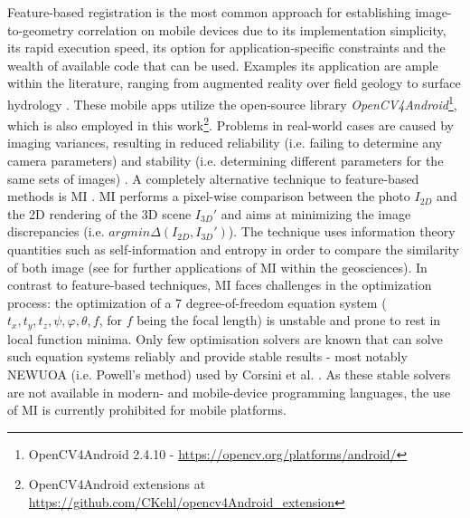\documentclass[review]{elsarticle}
\begin{document}
Feature-based registration is the most common approach for establishing image-to-geometry correlation on mobile devices due to its implementation simplicity, its rapid execution speed, its option for application-specific constraints and the wealth of available code that can be used. Examples its application are ample within the literature, ranging from augmented reality \cite{Gauglitz2014,Sweeney2015} over field geology \cite{Kehl2016_ISPRS,Kehl2017_VGC} to surface hydrology \cite{Kroehnert2017a,Boerner2016}. These mobile apps utilize the open-source library \textit{OpenCV4Android}\footnote{OpenCV4Android 2.4.10 - \url{https://opencv.org/platforms/android/}}, which is also employed in this work\footnote{OpenCV4Android extensions at \url{https://github.com/CKehl/opencv4Android_extension}}. Problems in real-world cases are caused by imaging variances, resulting in reduced reliability (i.e. failing to determine any camera parameters) and stability (i.e. determining different parameters for the same sets of images) \cite{Kehl2017_PHOR}. A completely alternative technique to feature-based methods is \gls{MI} \cite{Viola1997,Corsini2013}. \Gls{MI} performs a pixel-wise comparison between the photo $I_{2D}$ and the 2D rendering of the 3D scene $I_{3D}'$ and aims at minimizing the image discrepancies (i.e. $argmin \Delta(I_{2D}, I_{3D}')$). The technique uses information theory quantities such as self-information and entropy in order to compare the similarity of both image (see \cite{Bonaventura2017} for further applications of \gls{MI} within the geosciences). In contrast to feature-based techniques, \gls{MI} faces challenges in the optimization process: the optimization of a 7 degree-of-freedom equation system ($t_x,t_y,t_z,\psi,\varphi,\theta,f$, for $f$ being the focal length) is unstable and prone to rest in local function minima. Only few optimisation solvers are known that can solve such equation systems reliably and provide stable results - most notably NEWUOA (i.e. Powell's method\cite{Powell2006}) used by Corsini et al. \cite{Corsini2013}. As these stable solvers are not available in modern- and mobile-device programming languages, the use of \gls{MI} is currently prohibited for mobile platforms.
\end{document}
